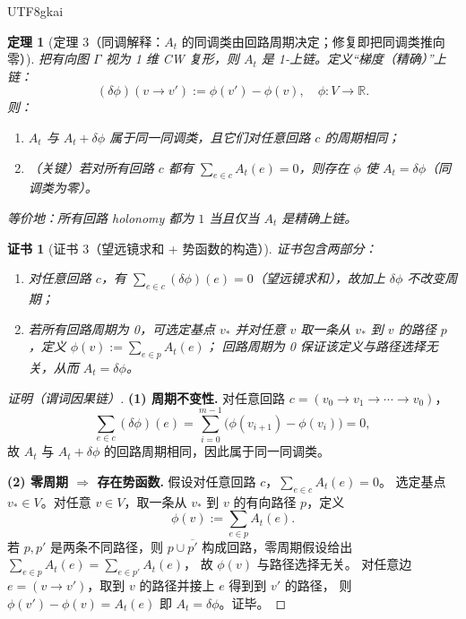 \documentclass[12pt]{article}
\newtheorem{theorem}{定理}[section]
\newtheorem{Certificate}{证书}[section]
\newcommand{\RR}{\mathbb{R}}
\begin{document}
\begin{CJK*}{UTF8}{gkai}
\begin{theorem}[定理 3（同调解释：$A_t$ 的同调类由回路周期决定；修复即把同调类推向零）]
\label{thm:tex27-ch5-thm3}
把有向图 $\Gamma$ 视为 1 维 CW 复形，则 $A_t$ 是 1-上链。定义“梯度（精确）”上链：
\[
  (\delta\phi)(v\to v'):=\phi(v')-\phi(v),\quad \phi:V\to\RR.
\]
则：
\begin{enumerate}
  \item $A_t$ 与 $A_t+\delta\phi$ 属于同一同调类，且它们对任意回路 $c$ 的周期相同；
  \item（关键）若对所有回路 $c$ 都有 $\sum_{e\in c}A_t(e)=0$，则存在 $\phi$ 使 $A_t=\delta\phi$（同调类为零）。
\end{enumerate}
等价地：所有回路 holonomy 都为 $1$ 当且仅当 $A_t$ 是精确上链。
\end{theorem}

\begin{Certificate}[证书 3（望远镜求和 + 势函数的构造）]
\label{cert:tex27-ch5-thm3}
证书包含两部分：
\begin{enumerate}
  \item 对任意回路 $c$，有 $\sum_{e\in c}(\delta\phi)(e)=0$（望远镜求和），故加上 $\delta\phi$ 不改变周期；
  \item 若所有回路周期为 0，可选定基点 $v_\ast$ 并对任意 $v$ 取一条从 $v_\ast$ 到 $v$ 的路径 $p$，定义
  $
    \phi(v):=\sum_{e\in p}A_t(e)
  $；
  回路周期为 0 保证该定义与路径选择无关，从而 $A_t=\delta\phi$。
\end{enumerate}
\end{Certificate}

\begin{proof}[证明（谓词因果链）]
\textbf{(1) 周期不变性.}
对任意回路 $c=(v_0\to v_1\to\cdots\to v_0)$，
\[
  \sum_{e\in c}(\delta\phi)(e)
  =\sum_{i=0}^{m-1}\bigl(\phi(v_{i+1})-\phi(v_i)\bigr)
  =0,
\]
故 $A_t$ 与 $A_t+\delta\phi$ 的回路周期相同，因此属于同一同调类。

\textbf{(2) 零周期 $\Rightarrow$ 存在势函数.}
假设对任意回路 $c$，$\sum_{e\in c}A_t(e)=0$。
选定基点 $v_\ast\in V$。对任意 $v\in V$，取一条从 $v_\ast$ 到 $v$ 的有向路径 $p$，定义
\[
  \phi(v):=\sum_{e\in p}A_t(e).
\]
若 $p,p'$ 是两条不同路径，则 $p\cup\overline{p'}$ 构成回路，零周期假设给出 $\sum_{e\in p}A_t(e)=\sum_{e\in p'}A_t(e)$，
故 $\phi(v)$ 与路径选择无关。
对任意边 $e=(v\to v')$，取到 $v$ 的路径并接上 $e$ 得到到 $v'$ 的路径，
则
$
  \phi(v')-\phi(v)=A_t(e)
$
即 $A_t=\delta\phi$。证毕。
\end{proof}


\end{CJK*}
\end{document}
